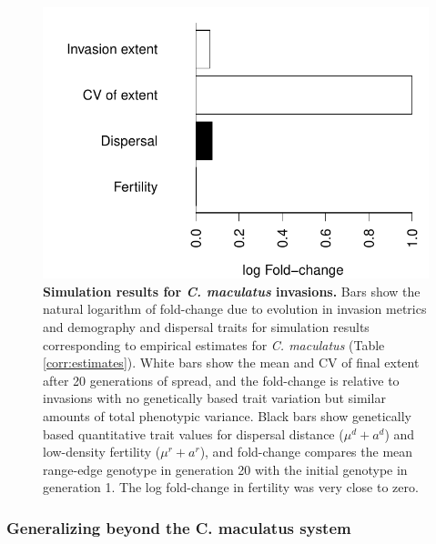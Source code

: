 \documentclass[11pt]{article}
\begin{document}
\begin{figure}[h!]
\centering
\includegraphics[width=0.5\linewidth]{Figures/foldchange_barplot}
\caption{\textbf{Simulation results for \textit{C. maculatus} invasions.} Bars show the natural logarithm of fold-change due to evolution in invasion metrics and demography and dispersal traits for simulation results corresponding to empirical estimates for \textit{C. maculatus} (Table \ref{corr:estimates}).
White bars show the mean and CV of final extent after 20 generations of spread, and the fold-change is relative to invasions with no genetically based trait variation but similar amounts of total phenotypic variance.
Black bars show genetically based quantitative trait values for dispersal distance ($\mu^{d} + a^{d}$) and low-density fertility ($\mu^{r} + a^{r}$), and fold-change compares the mean range-edge genotype in generation 20 with the initial genotype in generation 1.
The log fold-change in fertility was very close to zero.}
\label{corr:barplot}
\end{figure}

\subsubsection*{Generalizing beyond the \textup{C. maculatus} system}
\end{document}
